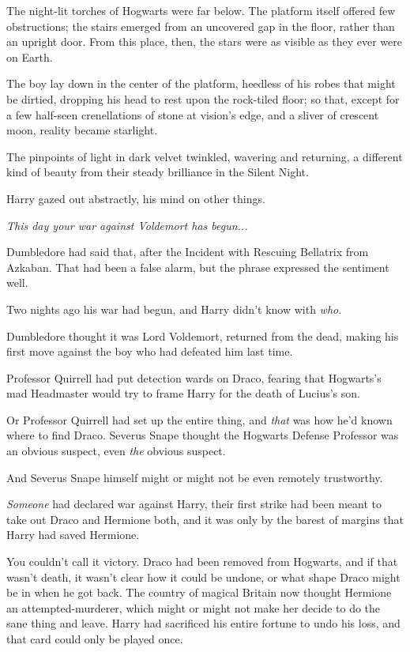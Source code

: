 The night-lit torches of Hogwarts were far below. The platform itself offered few obstructions; the stairs emerged from an uncovered gap in the floor, rather than an upright door. From this place, then, the stars were as visible as they ever were on Earth.

The boy lay down in the center of the platform, heedless of his robes that might be dirtied, dropping his head to rest upon the rock-tiled floor; so that, except for a few half-seen crenellations of stone at vision's edge, and a sliver of crescent moon, reality became starlight.

The pinpoints of light in dark velvet twinkled, wavering and returning, a different kind of beauty from their steady brilliance in the Silent Night.

Harry gazed out abstractly, his mind on other things.

\emph{This day your war against Voldemort has begun...}

Dumbledore had said that, after the Incident with Rescuing Bellatrix from Azkaban. That had been a false alarm, but the phrase expressed the sentiment well.

Two nights ago his war had begun, and Harry didn't know with \emph{who}.

Dumbledore thought it was Lord Voldemort, returned from the dead, making his first move against the boy who had defeated him last time.

Professor Quirrell had put detection wards on Draco, fearing that Hogwarts's mad Headmaster would try to frame Harry for the death of Lucius's son.

Or Professor Quirrell had set up the entire thing, and \emph{that} was how he'd known where to find Draco. Severus Snape thought the Hogwarts Defense Professor was an obvious suspect, even \emph{the} obvious suspect.

And Severus Snape himself might or might not be even remotely trustworthy.

\emph{Someone} had declared war against Harry, their first strike had been meant to take out Draco and Hermione both, and it was only by the barest of margins that Harry had saved Hermione.

You couldn't call it victory. Draco had been removed from Hogwarts, and if that wasn't death, it wasn't clear how it could be undone, or what shape Draco might be in when he got back. The country of magical Britain now thought Hermione an attempted-murderer, which might or might not make her decide to do the sane thing and leave. Harry had sacrificed his entire fortune to undo his loss, and that card could only be played once.

